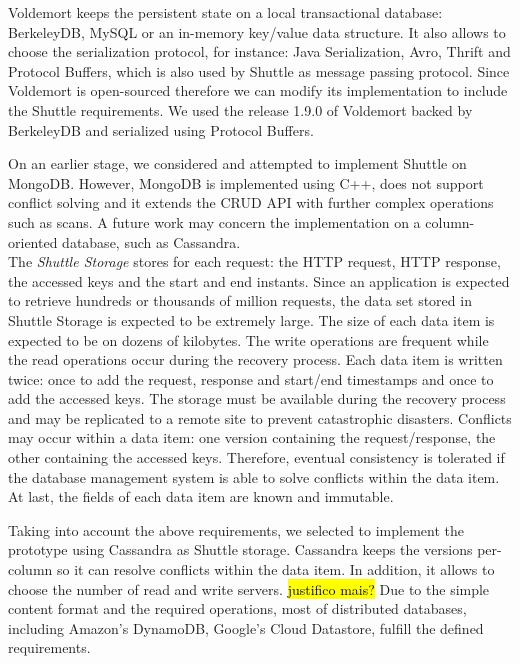 Voldemort keeps the persistent state on a local transactional database: BerkeleyDB, MySQL or an in-memory key/value data structure. It also allows to choose the serialization protocol, for instance: Java Serialization, Avro, Thrift and Protocol Buffers, which is also used by Shuttle as message passing protocol. Since Voldemort is open-sourced therefore we can modify its implementation to include the Shuttle requirements. We used the release 1.9.0 of Voldemort backed by BerkeleyDB and serialized using Protocol Buffers.

On an earlier stage, we considered and attempted to implement Shuttle on MongoDB. However, MongoDB is implemented using C++, does not support conflict solving and it extends the \ac{CRUD} \ac{API} with further complex operations such as scans. A future work may concern the implementation on a column-oriented database, such as Cassandra.\\

The \emph{Shuttle Storage} stores for each request: the \ac{HTTP} request, \ac{HTTP} response, the accessed keys and the start and end instants. Since an application is expected to retrieve hundreds or thousands of million requests, the data set stored in Shuttle Storage is expected to be extremely large. The size of each data item is expected to be on dozens of kilobytes. The write operations are frequent while the read operations occur during the recovery process. Each data item is written twice: once to add the request, response and start/end timestamps and once to add the accessed keys. The storage must be available during the recovery process and may be replicated to a remote site to prevent catastrophic disasters. Conflicts may occur within a data item: one version containing the request/response, the other containing the accessed keys. Therefore, eventual consistency is tolerated if the database management system is able to solve conflicts within the data item. At last, the fields of each data item are known and immutable.

Taking into account the above requirements, we selected to implement the prototype using Cassandra \cite{Lakshman2010a} as Shuttle storage. Cassandra keeps the versions per-column so it can resolve conflicts within the data item. In addition, it allows to choose the number of read and write servers. \hl{justifico mais? } Due to the simple content format and the required operations, most of distributed databases, including Amazon's DynamoDB, Google's Cloud Datastore, fulfill the defined requirements.


